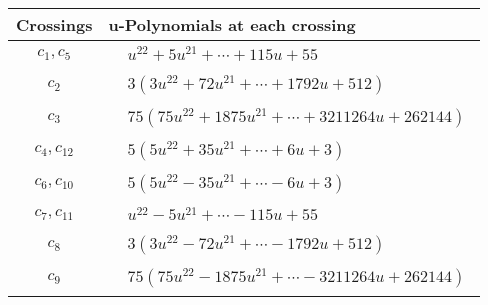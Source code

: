 \documentclass[1p]{elsarticle_modified}
\theoremstyle{definition}
\begin{document}
\begin{tabular}{m{50pt}|m{274pt}}
Crossings & \hspace{64pt}u-Polynomials at each crossing \\
\hline $$\begin{aligned}c_{1},c_{5}\end{aligned}$$&$\begin{aligned}
&u^{22}+5 u^{21}+\cdots+115 u+55
\end{aligned}$\\
\hline $$\begin{aligned}c_{2}\end{aligned}$$&$\begin{aligned}
&3(3 u^{22}+72 u^{21}+\cdots+1792 u+512)
\end{aligned}$\\
\hline $$\begin{aligned}c_{3}\end{aligned}$$&$\begin{aligned}
&75(75 u^{22}+1875 u^{21}+\cdots+3211264 u+262144)
\end{aligned}$\\
\hline $$\begin{aligned}c_{4},c_{12}\end{aligned}$$&$\begin{aligned}
&5(5 u^{22}+35 u^{21}+\cdots+6 u+3)
\end{aligned}$\\
\hline $$\begin{aligned}c_{6},c_{10}\end{aligned}$$&$\begin{aligned}
&5(5 u^{22}-35 u^{21}+\cdots-6 u+3)
\end{aligned}$\\
\hline $$\begin{aligned}c_{7},c_{11}\end{aligned}$$&$\begin{aligned}
&u^{22}-5 u^{21}+\cdots-115 u+55
\end{aligned}$\\
\hline $$\begin{aligned}c_{8}\end{aligned}$$&$\begin{aligned}
&3(3 u^{22}-72 u^{21}+\cdots-1792 u+512)
\end{aligned}$\\
\hline $$\begin{aligned}c_{9}\end{aligned}$$&$\begin{aligned}
&75(75 u^{22}-1875 u^{21}+\cdots-3211264 u+262144)
\end{aligned}$\\
\hline
\end{tabular}\\~\\
\end{document}
